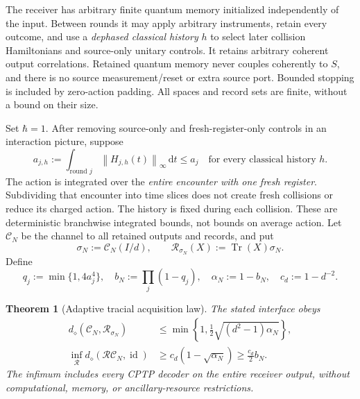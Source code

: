 \documentclass[11pt]{article}
\numberwithin{equation}{section}
\newtheorem{theorem}{Theorem}[section]
\theoremstyle{remark}
\newcommand{\Tr}{\operatorname{Tr}}
\newcommand{\id}{\operatorname{id}}
\newcommand{\Ccal}{\mathcal C}
\newcommand{\Rcal}{\mathcal R}
\newcommand{\norm}[1]{\left\lVert#1\right\rVert}
\newcommand{\dd}{\,\mathrm d}
\begin{document}
The receiver has arbitrary finite quantum memory initialized independently of
the input. Between rounds it may apply arbitrary instruments, retain every
outcome, and use a \emph{dephased classical history} \(h\) to select later
collision Hamiltonians and source-only unitary controls. It retains arbitrary
coherent output correlations. Retained quantum memory never couples coherently
to \(S\), and there is no source measurement/reset or extra source port.
Bounded stopping is included by zero-action padding. All spaces and record
sets are finite, without a bound on their size.

Set \(\hbar=1\). After removing source-only and fresh-register-only controls
in an interaction picture, suppose
\begin{equation}
 a_{j,h}:=\int_{\text{round }j}
       \norm{H_{j,h}(t)}_\infty\dd t\le a_j
       \quad\text{for every classical history }h.
 \label{eq:action}
\end{equation}
The action is integrated over the \emph{entire encounter with one fresh
register}. Subdividing that encounter into time slices does not create
fresh collisions or reduce its charged action.
The history is fixed during each collision. These are deterministic
branchwise integrated bounds, not bounds on average action. Let \(\Ccal_N\)
be the channel to all retained outputs and records, and put
\begin{equation}
 \sigma_N:=\Ccal_N(I/d),\qquad
 \Rcal_{\sigma_N}(X):=\Tr(X)\sigma_N.
\end{equation}
Define
\begin{equation}
 q_j:=\min\{1,4a_j^4\},\quad
 b_N:=\prod_j(1-q_j),\quad
 \alpha_N:=1-b_N,\quad c_d:=1-d^{-2}.
 \label{eq:parameters}
\end{equation}

\begin{theorem}[Adaptive tracial acquisition law]
\label{thm:universal}
The stated interface obeys
\begin{align}
 d_\diamond(\Ccal_N,\Rcal_{\sigma_N})
  &\le\min\left\{1,\tfrac12\sqrt{(d^2-1)\alpha_N}\right\},
       \label{eq:universal-output}\\
 \inf_{\mathcal R}d_\diamond(\mathcal R\Ccal_N,\id)
  &\ge c_d(1-\sqrt{\alpha_N})\ge\tfrac{c_d}{2}b_N.
       \label{eq:universal-recovery}
\end{align}
The infimum includes every CPTP decoder on the entire receiver output,
without computational, memory, or ancillary-resource restrictions.
\end{theorem}
\end{document}
